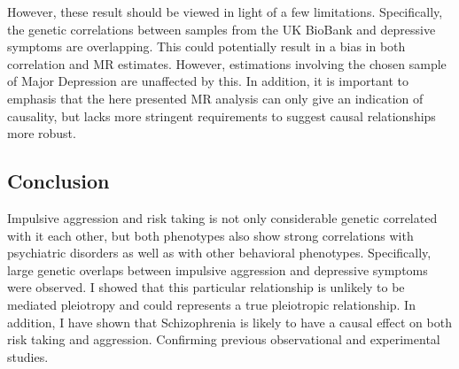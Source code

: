 However, these result should be viewed in light of a few limitations.
Specifically, the genetic correlations between samples from the UK BioBank and depressive symptoms are overlapping.
This could potentially result in a bias in both correlation and MR estimates.
However, estimations involving the chosen sample of Major Depression are unaffected by this.
In addition, it is important to emphasis that the here presented MR analysis can only give an indication of causality, but lacks more stringent requirements to suggest causal relationships more robust.

\subsection{Conclusion}
\label{sub:conclusion}

Impulsive aggression and risk taking is not only considerable genetic correlated with it each other, but both phenotypes also show strong correlations with psychiatric disorders as well as with other behavioral phenotypes.
Specifically, large genetic overlaps between impulsive aggression and depressive symptoms were observed.
I showed that this particular relationship is unlikely to be mediated pleiotropy and could represents a true pleiotropic relationship.
In addition, I have shown that Schizophrenia is likely to have a causal effect on both risk taking and aggression.
Confirming previous observational and experimental studies.

